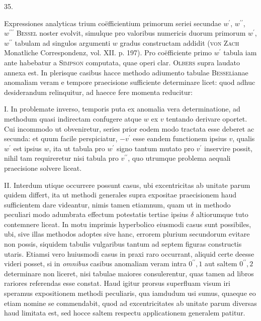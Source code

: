 \begin{center}
\hypertarget{native-052-article035}{}35.
\end{center}
Expressiones analyticas trium coëfficientium primorum seriei secundae $w^{\prime}$, $w^{\prime\prime}$, $w^{\prime\prime\prime}$ \textsc{Bessel} noster evolvit, simulque pro valoribus numericis duorum primorum $w^{\prime}$, $w^{\prime\prime}$ tabulam ad singulos argumenti $w$ gradus constructam addidit (\textsc{von Zach} Monatliche Correspondenz, vol. XII. p. 197). Pro coëfficiente primo $w^{\prime}$ tabula iam ante habebatur a \textsc{Simpson} computata, quae operi clar. \textsc{Olbers} supra laudato annexa est. In plerisque casibus hacce methodo adiumento tabulae \textsc{Bessel}ianae anomaliam veram e tempore praecisione sufficiente determinare licet: quod adhuc desiderandum relinquitur, ad haecce fere momenta reducitur:

I. In problemate inverso, temporis puta ex anomalia vera determinatione, ad methodum quasi indirectam confugere atque $w$ ex $v$ tentando derivare oportet. Cui incommodo ut obveniretur, series prior eodem modo tractata esse deberet ac secunda: et quum facile perspiciatur, $-v^{\prime}$ esse eandem functionem ipsius $v$, qualis $w^{\prime}$ est ipsius $w$, ita ut tabula pro $w^{\prime}$ signo tantum mutato pro $v^{\prime}$ inservire possit, nihil tam requireretur nisi tabula pro $v^{\prime\prime}$, quo utrumque problema aequali praecisione solvere liceat.

II. Interdum utique occurrere possunt casus, ubi excentricitas ab unitate parum quidem differt, ita ut methodi generales supra expositae praecisionem haud sufficientem dare videantur, nimis tamen etiamnum, quam ut in methodo peculiari modo adumbrata effectum potestatis tertiae ipsius $\delta$ altiorumque tuto contemnere liceat. In motu imprimis hyperbolico eiusmodi casus sunt possibiles, ubi, sive illas methodos adoptes sive hanc, errorem plurium secundorum evitare non possis, siquidem tabulis vulgaribus tantum ad septem figuras constructis utaris. Etiamsi vero huiusmodi casus in praxi raro occurrant, aliquid certe deesse videri posset, si in \emph{omnibus} casibus anomaliam veram intra $0^{\prime\prime}{,}1$ aut saltem $0^{\prime\prime}{,}2$ determinare non liceret, nisi tabulae maiores consulerentur, quas tamen ad libros rariores referendas esse constat. Haud igitur prorsus superfluam visum iri speramus expositionem methodi peculiaris, qua iamdudum usi sumus, quaeque eo etiam nomine se commendabit, quod ad excentricitates ab unitate parum diversas haud limitata est, sed hocce saltem respectu applicationem generalem patitur.

